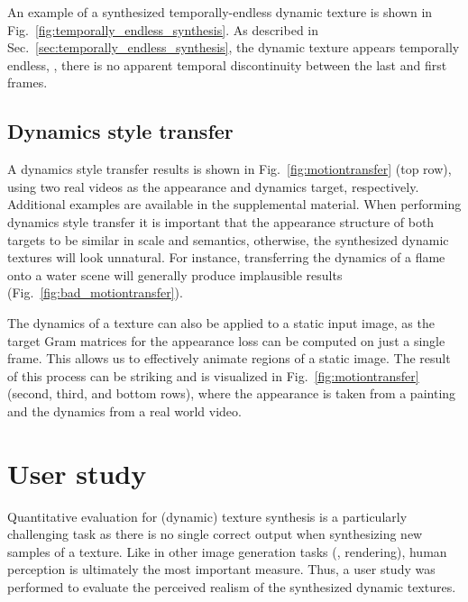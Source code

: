 An example of a synthesized temporally-endless dynamic texture is shown in
Fig.\ \ref{fig:temporally_endless_synthesis}. As described in Sec.\ 
\ref{sec:temporally_endless_synthesis}, the dynamic texture appears
temporally endless, \ie, there is no apparent temporal discontinuity between the last and first frames.



\subsection{Dynamics style transfer}

A dynamics style transfer results is shown in Fig.\ 
\ref{fig:motiontransfer} (top row), using two real videos as the appearance and dynamics target, respectively.
Additional examples are available in the supplemental material.
When performing dynamics style transfer it is important
that the appearance structure of both targets to be similar in scale and semantics,
otherwise, the synthesized dynamic textures will look unnatural.
For instance, transferring the dynamics of a flame onto a water 
scene will generally produce implausible results (Fig.\ \ref{fig:bad_motiontransfer}).



The dynamics of a texture can also be applied to a static input image,
as the target Gram matrices for the appearance loss can be computed
on just a single frame.
This allows us to effectively animate regions of a static image.
The result of this process can be striking and is visualized in
Fig.\ \ref{fig:motiontransfer} (second, third, and bottom rows), where the appearance is 
taken from a painting and the dynamics from a real world video.

\clearpage

\clearpage

\section{User study}\label{sec:user_study}

Quantitative evaluation for (dynamic) texture synthesis is a particularly
challenging task as there is no single correct output when 
synthesizing new samples of a texture.
Like in other image generation tasks (\eg, rendering), 
human perception is ultimately the most important measure.
Thus, a user study was performed to evaluate the perceived 
realism of the synthesized dynamic textures.

